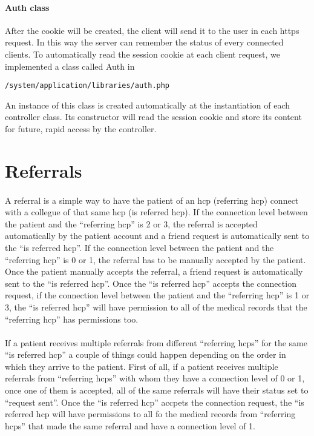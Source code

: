 \paragraph{Auth class}
After the cookie will be created, the client will send it to the user in each https request. In this way the server can remember the status of every connected clients. To automatically read the session cookie at each client request, we implemented a class called Auth in
\begin{verbatim}
/system/application/libraries/auth.php
\end{verbatim}
An instance of this class is created automatically at the instantiation of each controller class. Its constructor will read the session cookie and store its content for future, rapid access by the controller.

\section{Referrals}
\paragraph{} A referral is a simple way to have the patient of an hcp (referring hcp) connect with a collegue of that same hcp (is referred hcp).  If the connection level between the patient and the ``referring hcp'' is 2 or 3, the referral is accepted automatically by the patient account and a friend request is automatically sent to the ``is referred hcp''.  If the connection level between the patient and the ``referring hcp'' is 0 or 1, the referral has to be manually accepted by the patient.  Once the patient manually accepts the referral, a friend request is automatically sent to the ``is referred hcp''.  Once the ``is referred hcp'' accepts the connection request, if the connection level between the patient and the ``referring hcp'' is 1 or 3, the ``is referred hcp'' will have permission to all of the medical records that the ``referring hcp'' has permissions too.

\paragraph{  } If a patient receives multiple referrals from different ``referring hcps'' for the same ``is referred hcp'' a couple of things could happen depending on the order in which they arrive to the patient. First of all, if a patient receives multiple referrals from ``referring hcps'' with whom they have a connection level of 0 or 1, once one of them is accepted, all of the same referrals will have their status set to ``request sent''.  Once the ``is referred hcp'' accpets the connection request, the ``is referred hcp will have permissions to all fo the medical records from ``referring hcps'' that made the same referral and have a connection level of 1.


